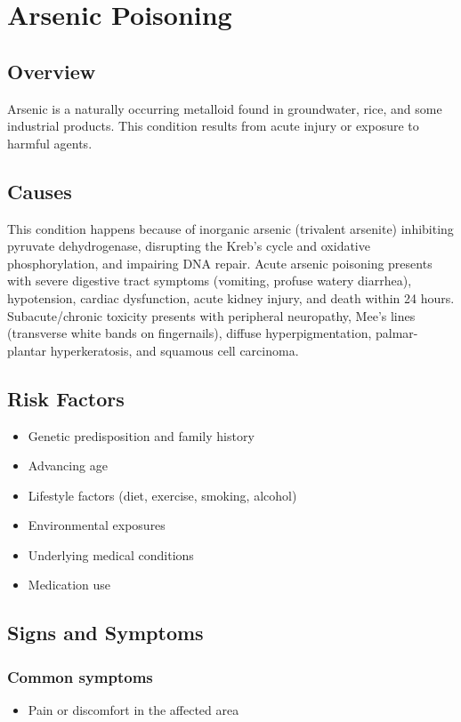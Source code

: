 \chapter{Arsenic Poisoning}
\label{sec:Arsenic Poisoning}

\section{Overview}
Arsenic is a naturally occurring metalloid found in groundwater, rice, and some industrial products. This condition results from acute injury or exposure to harmful agents.
\section{Causes}
This condition happens because of inorganic arsenic (trivalent arsenite) inhibiting pyruvate dehydrogenase, disrupting the Kreb's cycle and oxidative phosphorylation, and impairing DNA repair. Acute arsenic poisoning presents with severe digestive tract symptoms (vomiting, profuse watery diarrhea), hypotension, cardiac dysfunction, acute kidney injury, and death within 24 hours. Subacute/chronic toxicity presents with peripheral neuropathy, Mee's lines (transverse white bands on fingernails), diffuse hyperpigmentation, palmar-plantar hyperkeratosis, and squamous cell carcinoma.     
\section{Risk Factors}

\begin{itemize}[noitemsep]
  \item Genetic predisposition and family history
  \item Advancing age
  \item Lifestyle factors (diet, exercise, smoking, alcohol)
  \item Environmental exposures
  \item Underlying medical conditions
  \item Medication use
\end{itemize}
\section{Signs and Symptoms}

\subsection{Common symptoms}
\begin{itemize}[noitemsep]
  \item Pain or discomfort in the affected area
  \end{itemize}

